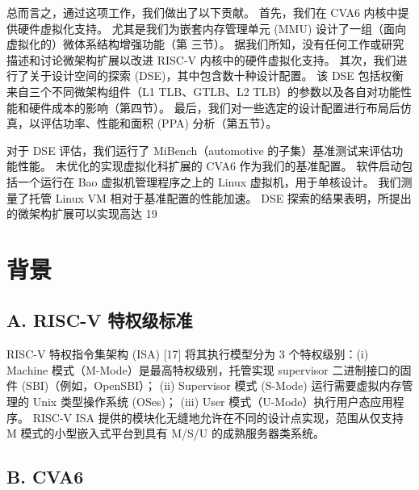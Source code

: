 总而言之，通过这项工作，我们做出了以下贡献。 首先，我们在 CVA6 内核中提供硬件虚拟化支持。 尤其是我们为嵌套内存管理单元 (MMU) 设计了一组（面向虚拟化的）微体系结构增强功能（第 三节）。 据我们所知，没有任何工作或研究描述和讨论微架构扩展以改进 RISC-V 内核中的硬件虚拟化支持。 其次，我们进行了关于设计空间的探索 (DSE)，其中包含数十种设计配置。 该 DSE 包括权衡来自三个不同微架构组件（L1 TLB、GTLB、L2 TLB）的参数以及各自对功能性能和硬件成本的影响（第四节）。 最后，我们对一些选定的设计配置进行布局后仿真，以评估功率、性能和面积 (PPA) 分析（第五节）。

对于 DSE 评估，我们运行了 MiBench（automotive 的子集）基准测试来评估功能性能。 未优化的实现虚拟化科扩展的 CVA6 作为我们的基准配置。 软件启动包括一个运行在 Bao 虚拟机管理程序之上的 Linux 虚拟机，用于单核设计。 我们测量了托管 Linux VM 相对于基准配置的性能加速。 DSE 探索的结果表明，所提出的微架构扩展可以实现高达 19%

\section*{背景}

\subsection*{A. RISC-V 特权级标准}

RISC-V 特权指令集架构 (ISA) [17] 将其执行模型分为 3 个特权级别：(i) Machine 模式（M-Mode）是最高特权级别，托管实现  supervisor 二进制接口的固件 (SBI)（例如，OpenSBI）； (ii) Supervisor 模式 (S-Mode) 运行需要虚拟内存管理的 Unix 类型操作系统 (OSes)； (iii) User 模式（U-Mode）执行用户态应用程序。 RISC-V ISA 提供的模块化无缝地允许在不同的设计点实现，范围从仅支持 M 模式的小型嵌入式平台到具有 M/S/U 的成熟服务器类系统。

\subsection*{B. CVA6}

